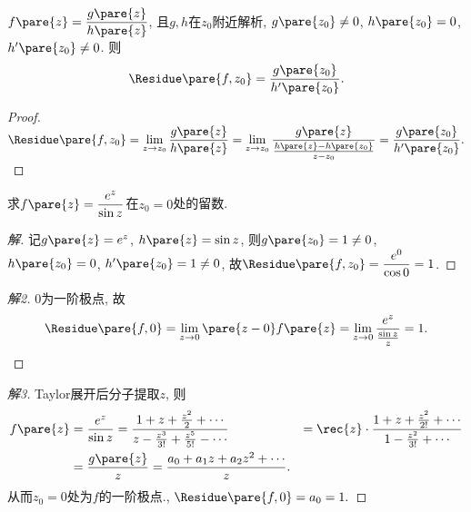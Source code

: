 \documentclass[../ComplexVariable.tex]{subfiles}
\begin{document}
\begin{sample}
    \begin{ex}
        $\displaystyle f\pare{z} = \frac{g\pare{z}}{h\pare{z}}$, 且$g,h$在$z_0$附近解析, $g\pare{z_0}\neq 0$, $h\pare{z_0} = 0$, $h'\pare{z_0}\neq 0$. 则
        \[ \Residue \pare{f,z_0} = \frac{g\pare{z_0}}{h'\pare{z_0}}. \]
    \end{ex}
    \begin{proof}
        $\displaystyle
            \Residue\pare{f,z_0} = \lim_{z\rightarrow z_0} \frac{g\pare{z}}{h\pare{z}} = \lim_{z\rightarrow z_0} \frac{g\pare{z}}{\frac{h\pare{z}-h\pare{z_0}}{z-z_0}} = \frac{g\pare{z_0}}{h'\pare{z_0}}.
        $
    \end{proof}
\end{sample}
\begin{sample}
    \begin{ex}
        求$\displaystyle f\pare{z} = \frac{e^z}{\sin z}$在$z_0=0$处的留数.
    \end{ex}
    \begin{proof}[解]
        记$g\pare{z} = e^z$, $h\pare{z} = \sin z$, 则$g\pare{z_0} = 1\neq 0$, $h\pare{z_0} = 0$, $h'\pare{z_0} = 1\neq 0$, 故$\Residue\pare{f,z_0} = \displaystyle \frac{e^0}{\cos 0} = 1$.
    \end{proof}
    \begin{proof}[解2]
        $0$为一阶极点, 故
        \[ \Residue\pare{f,0} = \lim_{z\rightarrow 0} \pare{z-0}f\pare{z} = \lim_{z\rightarrow 0} \frac{e^z}{\frac{\sin z}{z}} = 1. \qedhere \]
    \end{proof}
    \begin{proof}[解3]
        Taylor展开后分子提取$z$, 则
        \begin{align*}
            f\pare{z} &= \frac{e^z}{\sin z} = \frac{1+z + \frac{z^2}{2} + \cdots}{z-\frac{z^3}{3!} + \frac{z^5}{5!} - \cdots} 
            &= \rec{z} \cdot \frac{1 + z + \frac{z^2}{2!} + \cdots}{1 - \frac{z^2}{3!} + \cdots} \\
            &= \frac{g\pare{z}}{z} = \frac{a_0 + a_1 z + a_2 z^2 + \cdots}{z}.
        \end{align*}
        从而$z_0 = 0$处为$f$的一阶极点., $\Residue\pare{f,0} = a_0 = 1.$
    \end{proof}
\end{sample}
\end{document}

